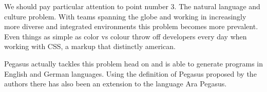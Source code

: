 \documentclass[12pt]{article}
\begin{document}
We should pay particular attention to point number 3. The natural language and culture problem. With teams spanning the globe and working in increasingly more diverse and integrated environments
this problem becomes more prevalent. Even things as simple as color vs colour throw off developers every day when working with CSS, a markup that distinctly american.

Pegasus actually tackles this problem head on and is able to generate programs in English and German languages.
Using the definition of Pegasus proposed by the authors there has also been an extension to the language
Ara Pegasus.

\clearpage
\printbibliography
\end{document}
